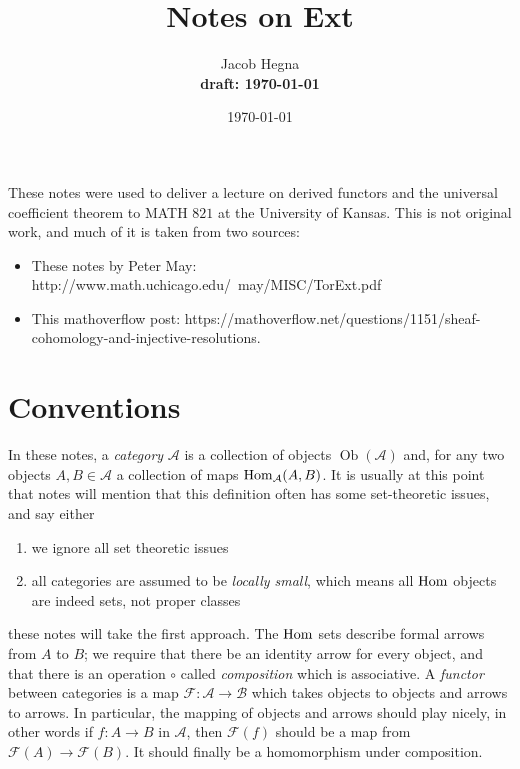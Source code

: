 

\usepackage[utf8]{inputenc}
\usepackage{mathtools}
\usepackage{multirow}
\usepackage{graphicx}
\usepackage{caption}
\usepackage{tikz-cd}


\graphicspath{ {src/images/} }



\title{Notes on Ext}
\author{Jacob Hegna \\ \textbf{draft: \today}}
\date{\today}

\maketitle

These notes were used to deliver a lecture on derived functors and the universal
coefficient theorem to MATH $821$ at the University of Kansas. This is not
original work, and much of it is taken from two sources:
\begin{itemize}
    \item These notes by Peter May: http://www.math.uchicago.edu/~may/MISC/TorExt.pdf
    \item This mathoverflow post:
        https://mathoverflow.net/questions/1151/sheaf-cohomology-and-injective-resolutions.
\end{itemize}

\tableofcontents

\section{Conventions}

In these notes, a \textit{category} $\mathcal{A}$ is a collection of objects
$\mathop{Ob}(\mathcal{A})$ and, for any two objects $A, B \in \mathcal{A}$ a
collection of maps $\operatorname{Hom}_\mathcal{A}(A, B)$. It is usually at this point that
notes will mention that this definition often has some set-theoretic issues, and
say either
\begin{enumerate}
    \item we ignore all set theoretic issues
    \item all categories are assumed to be \textit{locally small}, which means
        all $\operatorname{Hom}$ objects are indeed sets, not proper classes
\end{enumerate}
these notes will take the first approach. The $\operatorname{Hom}$ sets describe formal arrows
from $A$ to $B$; we require that there be an identity arrow for every object,
and that there is an operation $\circ$ called \textit{composition} which is
associative. A \textit{functor} between categories is a map $\mathcal{F} :
\mathcal{A} \to \mathcal{B}$ which takes objects to objects and arrows to
arrows. In particular, the mapping of objects and arrows should play nicely, in
other words if $f : A \to B$ in $\mathcal{A}$, then $\mathcal{F}(f)$ should be a
map from $\mathcal{F}(A) \to \mathcal{F}(B)$. It should finally be a
homomorphism under composition.

